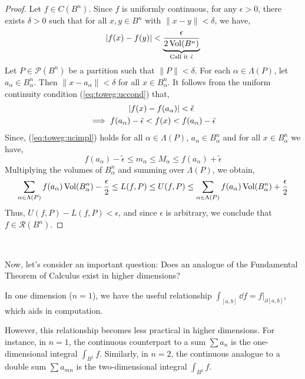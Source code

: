 \documentclass[../Analysis-3.tex]{subfiles}
\begin{document}
\begin{proof}
  Let $f \in C(B^n)$. Since $f$ is uniformly continuous, for any $\epsilon > 0$, there exists $\delta > 0$ such that for all $x, y \in B^n$ with $\|x-y\| < \delta$, we have,
  \begin{equation}\label{eq:toweg:uccond}
    \abs{f(x) - f(y)} < \underbrace{\frac{\epsilon}{2\operatorname{Vol}(B^n)}}_{\text{Call it }\tilde{\epsilon}}
  \end{equation}
  Let $P \in \mathcal{P}(B^n)$ be a partition such that $\|P\| < \delta$. For each $\alpha \in \Lambda(P)$, let $a_{\alpha} \in B_{\alpha}^n$. Then $\|x-a_{\alpha}\| < \delta$ for all $x \in B_{\alpha}^n$. It follows from the uniform continuity condition (\ref{eq:toweg:uccond}) that,
  \begin{align}
    \abs{f(x) - f(a_{\alpha})}                         & < \tilde{\epsilon}  \nonumber                               \\
    \implies f(a_{\alpha}) - \tilde{\epsilon} < f(x) < & \; f(a_{\alpha}) - \tilde{\epsilon} \label{eq:toweg:ucimpl}
  \end{align}
  Since, (\ref{eq:toweg:ucimpl}) holds for all $ \alpha \in \Lambda(P) $, $ a_{\alpha} \in B_{\alpha}^n $ and for all $ x \in B_{\alpha}^n $ we have,
  \[  f(a_{\alpha}) - \tilde{\epsilon} \leq m_{\alpha} \leq M_{\alpha} \leq f(a_{\alpha}) + \tilde{\epsilon}  \]
  Multiplying the volumes of $B_{\alpha}^n$ and summing over $\Lambda(P)$, we obtain,
  \[
    \sum_{\alpha \in \Lambda(P)} f(a_{\alpha})\operatorname{Vol}(B_{\alpha}^n) - \frac\epsilon2 \leq L(f,P) \leq U(f,P) \leq \sum_{\alpha \in \Lambda(P)} f(a_{\alpha})\operatorname{Vol}(B_{\alpha}^n) + \frac\epsilon2
  \]
  Thus, $U(f,P) - L(f,P) < \epsilon$, and since $\epsilon$ is arbitrary, we conclude that $f \in \mathscr{R}(B^n)$.
\end{proof}

\

Now, let's consider an important question: Does an analogue of the Fundamental Theorem of Calculus exist in higher dimensions?

In one dimension ($n=1$), we have the useful relationship $ \displaystyle\int_{[a,b]} \dd f = f\Big\vert_{\partial[a,b]} $, which aids in computation.

However, this relationship becomes less practical in higher dimensions. For instance, in $n=1$, the continuous counterpart to a sum $ \displaystyle\sum a_n $ is the one-dimensional integral $ \displaystyle\int_{B^1} f $. Similarly, in $n=2$, the continuous analogue to a double sum $ \displaystyle\sum a_{mn} $ is the two-dimensional integral $ \displaystyle\int_{B^2} f $.
\end{document}
